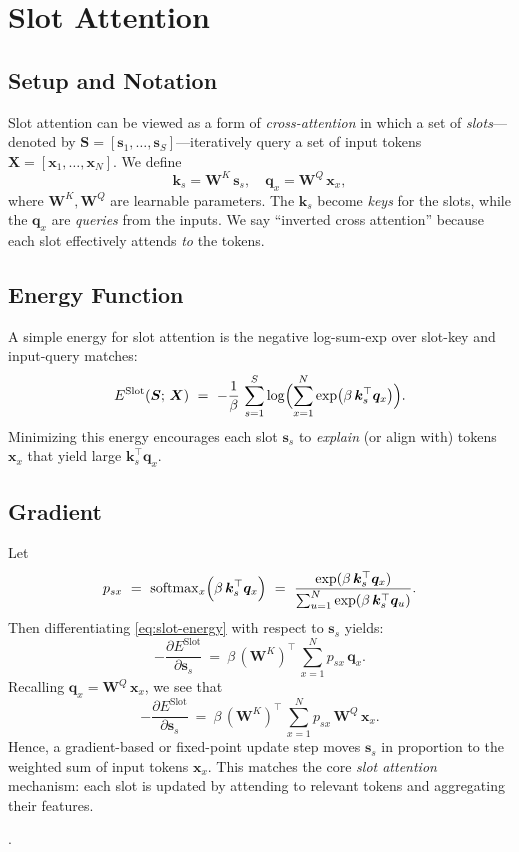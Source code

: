 \documentclass{article}
\begin{document}
\section{Slot Attention}

\subsection{Setup and Notation}

Slot attention can be viewed as a form of \emph{cross-attention} in which a set of \emph{slots}---denoted by \(\bm{S} = [\bm{s}_1, \ldots, \bm{s}_S]\)---iteratively query a set of input tokens \(\bm{X} = [\bm{x}_1, \ldots, \bm{x}_N]\).  We define
\[
\bm{k}_s = \bm{W}^K \,\bm{s}_s,
\quad
\bm{q}_x = \bm{W}^Q \,\bm{x}_x,
\]
where \(\bm{W}^K, \bm{W}^Q\) are learnable parameters.  The \(\bm{k}_s\) become \emph{keys} for the slots, while the \(\bm{q}_x\) are \emph{queries} from the inputs.  We say ``inverted cross attention'' because each slot effectively attends \emph{to} the tokens.

\subsection{Energy Function}

A simple energy for slot attention is the negative log-sum-exp over slot-key and input-query matches:
\begin{equation}
E^{\text{Slot}}(\bm{S};\,\bm{X})
~=~
-\frac{1}{\beta}\,\sum_{s=1}^S
\log \Bigl(\sum_{x=1}^N \exp \bigl(\beta\,\bm{k}_s^\top \bm{q}_x\bigr)\Bigr).
\label{eq:slot-energy}
\end{equation}
Minimizing this energy encourages each slot \(\bm{s}_s\) to \emph{explain} (or align with) tokens \(\bm{x}_x\) that yield large \(\bm{k}_s^\top \bm{q}_x\).

\subsection{Gradient}

Let
\[
p_{sx}
~=~
\mathrm{softmax}_x
 \Bigl(\beta \,\bm{k}_s^\top \bm{q}_x\Bigr)
~=~
\frac{\exp(\beta\,\bm{k}_s^\top \bm{q}_x)}{\sum_{u=1}^N \exp(\beta\,\bm{k}_s^\top \bm{q}_u)}.
\]
Then differentiating \eqref{eq:slot-energy} with respect to \(\bm{s}_s\) yields:
\[
-\frac{\partial E^{\text{Slot}}}{\partial \bm{s}_s}
~=~
\beta \,(\bm{W}^K)^\top \,\sum_{x=1}^N 
p_{sx}\,\bm{q}_x.
\]
Recalling \(\bm{q}_x = \bm{W}^Q\,\bm{x}_x\), we see that
\[
-\frac{\partial E^{\text{Slot}}}{\partial \bm{s}_s}
~=~
\beta \,(\bm{W}^K)^\top \,\sum_{x=1}^N p_{sx}\,\bm{W}^Q\,\bm{x}_x.
\]
Hence, a gradient-based or fixed-point update step moves \(\bm{s}_s\) in proportion to the weighted sum of input tokens \(\bm{x}_x\).  This matches the core \emph{slot attention} mechanism: each slot is updated by attending to relevant tokens and aggregating their features.

\cite{shyam2024tree, hoover2024energy, singh2023attention, kori2024identifiable, annabi2022relationship}.


 
\end{document}
